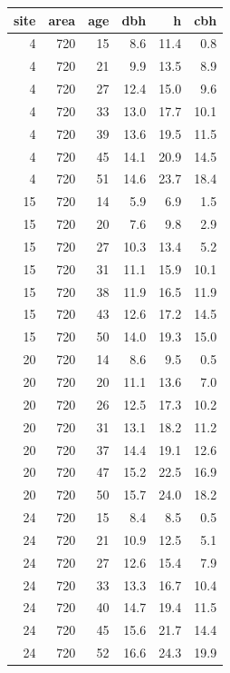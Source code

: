 \documentclass[article]{jss}
\begin{document}
\begin{CodeChunk}

\begin{tabular}{r|r|r|r|r|r}
\hline
site & area & age & dbh & h & cbh\\
\hline
4 & 720 & 15 & 8.6 & 11.4 & 0.8\\
\hline
4 & 720 & 21 & 9.9 & 13.5 & 8.9\\
\hline
4 & 720 & 27 & 12.4 & 15.0 & 9.6\\
\hline
4 & 720 & 33 & 13.0 & 17.7 & 10.1\\
\hline
4 & 720 & 39 & 13.6 & 19.5 & 11.5\\
\hline
4 & 720 & 45 & 14.1 & 20.9 & 14.5\\
\hline
4 & 720 & 51 & 14.6 & 23.7 & 18.4\\
\hline
15 & 720 & 14 & 5.9 & 6.9 & 1.5\\
\hline
15 & 720 & 20 & 7.6 & 9.8 & 2.9\\
\hline
15 & 720 & 27 & 10.3 & 13.4 & 5.2\\
\hline
15 & 720 & 31 & 11.1 & 15.9 & 10.1\\
\hline
15 & 720 & 38 & 11.9 & 16.5 & 11.9\\
\hline
15 & 720 & 43 & 12.6 & 17.2 & 14.5\\
\hline
15 & 720 & 50 & 14.0 & 19.3 & 15.0\\
\hline
20 & 720 & 14 & 8.6 & 9.5 & 0.5\\
\hline
20 & 720 & 20 & 11.1 & 13.6 & 7.0\\
\hline
20 & 720 & 26 & 12.5 & 17.3 & 10.2\\
\hline
20 & 720 & 31 & 13.1 & 18.2 & 11.2\\
\hline
20 & 720 & 37 & 14.4 & 19.1 & 12.6\\
\hline
20 & 720 & 47 & 15.2 & 22.5 & 16.9\\
\hline
20 & 720 & 50 & 15.7 & 24.0 & 18.2\\
\hline
24 & 720 & 15 & 8.4 & 8.5 & 0.5\\
\hline
24 & 720 & 21 & 10.9 & 12.5 & 5.1\\
\hline
24 & 720 & 27 & 12.6 & 15.4 & 7.9\\
\hline
24 & 720 & 33 & 13.3 & 16.7 & 10.4\\
\hline
24 & 720 & 40 & 14.7 & 19.4 & 11.5\\
\hline
24 & 720 & 45 & 15.6 & 21.7 & 14.4\\
\hline
24 & 720 & 52 & 16.6 & 24.3 & 19.9\\
\hline
\end{tabular}

\end{CodeChunk}
\end{document}
